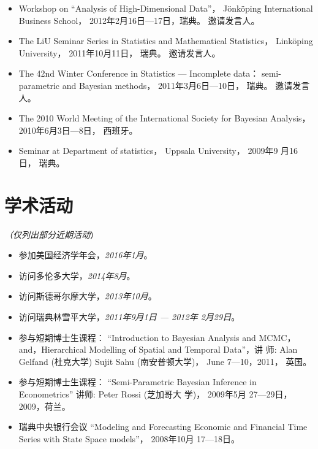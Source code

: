 \documentclass[twoside,a4paper,10pt]{amsart}
\begin{document}
\begin{itemize}
\item Workshop on ``Analysis of High-Dimensional Data''，
  Jönköping International Business School， 2012年2月16日---17日，瑞典。
  邀请发言人。

\item The LiU Seminar Series in Statistics and Mathematical Statistics，
  Linköping University， 2011年10月11日， 瑞典。 邀请发言人。

\item The 42nd Winter Conference in Statistics --- Incomplete data：
  semi-parametric and Bayesian methods， 2011年3月6日---10日，
  瑞典。 邀请发言人。

\item The 2010 World Meeting of the International Society for Bayesian
  Analysis， 2010年6月3日---8日， 西班牙。

\item Seminar at Department of statistics， Uppsala University， 2009年9
  月16日， 瑞典。

\end{itemize}


\section*{学术活动}
\emph{（仅列出部分近期活动}）

\begin{itemize}
\item 参加美国经济学年会，\emph{2016年1月}。
\item 访问多伦多大学，\emph{2014年8月}。
\item 访问斯德哥尔摩大学，\emph{2013年10月}。

\item 访问瑞典林雪平大学，\emph{2011年9月1日 --- 2012年 2月29日}。

\item 参与短期博士生课程： ``Introduction to Bayesian Analysis and
  MCMC， and，Hierarchical Modelling of Spatial and Temporal Data''，讲
  师: Alan Gelfand (杜克大学) Sujit Sahu (南安普顿大学)， June
  7---10，2011， 英国。

\item 参与短期博士生课程： ``Semi-Parametric Bayesian Inference in
  Econometrics'' 讲师: Peter Rossi (芝加哥大
  学)， 2009年5月 27---29日，2009，荷兰。

\item 瑞典中央银行会议 ``Modeling and Forecasting Economic and
  Financial Time Series with State Space
  models''， 2008年10月 17---18日。
\end{itemize}
\end{document}
